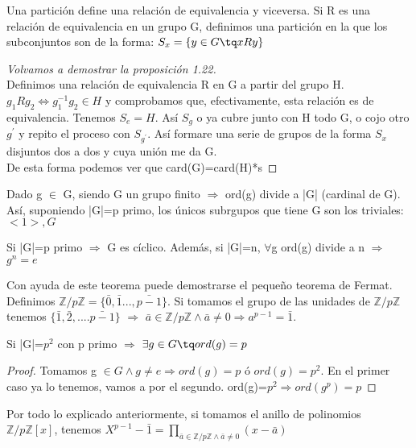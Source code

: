 \documentclass[a4paper,10pt]{apuntes}
\newenvironment{example}[1][Ejemplo]{\begin{trivlist}
\item[\hskip \labelsep {\bfseries #1}]}{\end{trivlist}}
\begin{document}
  Una partición define una relación de equivalencia y viceversa. Si R es una relación de equivalencia en un grupo G, 
  definimos una partición en la que los subconjuntos son de la forma: $S_{x}=\{y\in G \tq xRy\}$
  
  \begin{proof}[Volvamos a demostrar la proposición 1.22]
   \\Definimos una relación de equivalencia R en G a partir del grupo H.
   $g_{1}Rg_{2} \Leftrightarrow g_{1}^{-1}g_{2}\in H$  y comprobamos que, efectivamente, esta relación es de equivalencia.
   Tenemos $S_{e}=H$. Así $S_{g}$  o ya cubre junto con H todo G, o cojo otro $g^{'}$  y repito el proceso con $S_{g^{'}}$.
   Así formare una serie de grupos de la forma $S_{x}$  disjuntos dos a dos y cuya unión me da G.\\
   De esta forma podemos ver que card(G)=card(H)*s
  \end{proof}
  
  \begin{corol}
   Dado g $\in$ G, siendo G un grupo finito $\Rightarrow$  ord(g) divide a |G| (cardinal de G). Así, suponiendo |G|=p primo,
   los únicos subrgupos que tiene G son los triviales: $<1>, G$
  \end{corol}
  \begin{theorem}
   Si |G|=p primo $\Rightarrow$  G es cíclico. Además, si |G|=n, $\forall$g ord(g) divide a n $\Rightarrow$  $g^{n}=e$
  \end{theorem}
  \begin{example}
   Con ayuda de este teorema puede demostrarse el pequeño teorema de Fermat. 
   Definimos $\mathds{Z}/p\mathds{Z}=\{\bar{0},\bar{1}...,\bar{p-1}\}$.
   Si tomamos el grupo de las unidades de $\mathds{Z}/p\mathds{Z}$ tenemos $\{\bar{1}, \bar{2},....\bar{p-1}\}$ $\Rightarrow$
   $\bar{a}\in\mathds{Z}/p\mathds{Z} \wedge \bar{a}\neq 0 \Rightarrow a^{p-1}=\bar{1}$.
  \end{example}
  \begin{theorem}
   Si |G|=$p^{2}$  con p primo $\Rightarrow$  $\exists g \in G \tq ord(g)=p$
  \end{theorem}
  \begin{proof}
   Tomamos g $\in G \wedge g\neq e \Rightarrow ord(g)=p$  ó $ord(g)=p^{2}$. En el primer caso ya lo tenemos, vamos a por el segundo.
   ord(g)=$p^{2}\Rightarrow ord(g^{p})=p$
  \end{proof}
  \begin{example}
   Por todo lo explicado anteriormente, si tomamos el anillo de polinomios $\mathds{Z}/p\mathds{Z}[x]$, tenemos $X^{p-1}-\bar{1}=
   \prod_{\bar{a}\in\mathds{Z}/p\mathds{Z} \wedge \bar{a}\neq 0}(x-\bar{a})$
  \end{example}
  
\end{document}
